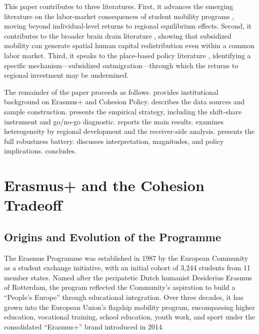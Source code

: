 \documentclass[12pt]{article}
\begin{document}
This paper contributes to three literatures. First, it advances the emerging literature on the labor-market consequences of student mobility programs \citep{parey_waldinger_2011, oosterbeek_webbink_2011, di_pietro_2015, sorrenti_2025, de_benedetto_etal_2025}, moving beyond individual-level returns to regional equilibrium effects. Second, it contributes to the broader brain drain literature \citep{borjas_2003, docquier_rapoport_2012, beine_docquier_rapoport_2001}, showing that subsidized mobility can generate spatial human capital redistribution even within a common labor market. Third, it speaks to the place-based policy literature \citep{rodriguez_pose_2018, iammarino_rodriguez_pose_storper_2019, glaeser_saiz_2004}, identifying a specific mechanism---subsidized outmigration---through which the returns to regional investment may be undermined.

The remainder of the paper proceeds as follows.  provides institutional background on Erasmus+ and Cohesion Policy.  describes the data sources and sample construction.  presents the empirical strategy, including the shift-share instrument and go/no-go diagnostic.  reports the main results.  examines heterogeneity by regional development and the receiver-side analysis.  presents the full robustness battery.  discusses interpretation, magnitudes, and policy implications.  concludes.


\section{Erasmus+ and the Cohesion Tradeoff}
\label{sec:background}

\subsection{Origins and Evolution of the Programme}

The Erasmus Programme was established in 1987 by the European Community as a student exchange initiative, with an initial cohort of 3,244 students from 11 member states. Named after the peripatetic Dutch humanist Desiderius Erasmus of Rotterdam, the program reflected the Community's aspiration to build a ``People's Europe'' through educational integration. Over three decades, it has grown into the European Union's flagship mobility program, encompassing higher education, vocational training, school education, youth work, and sport under the consolidated ``Erasmus+'' brand introduced in 2014.
\end{document}
